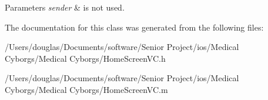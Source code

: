 \begin{DoxyParams}{Parameters}
{\em sender} & is not used. \\
\hline
\end{DoxyParams}


The documentation for this class was generated from the following files\-:\begin{DoxyCompactItemize}
\item 
/\-Users/douglas/\-Documents/software/\-Senior Project/ios/\-Medical Cyborgs/\-Medical Cyborgs/Home\-Screen\-V\-C.\-h\item 
/\-Users/douglas/\-Documents/software/\-Senior Project/ios/\-Medical Cyborgs/\-Medical Cyborgs/Home\-Screen\-V\-C.\-m\end{DoxyCompactItemize}
